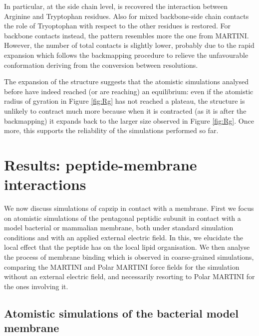 In particular, at the side chain level, is recovered the interaction between Arginine and Tryptophan residues. Also for mixed backbone-side chain contacts the role of Tryoptophan with respect to the other residues is restored. For backbone contacts instead, the pattern resembles more the one from MARTINI. However, the number of total contacts is slightly lower, probably due to the rapid expansion which follows the backmapping procedure to relieve the unfavourable conformation deriving from the conversion between resolutions.

The expansion of the structure suggests that the atomistic simulations analysed before have indeed reached (or are reaching) an equilibrium: even if the atomistic radius of gyration in Figure \ref{fig:Rg} has not reached a plateau, the structure is unlikely to contract much more because when it is contracted (as it is after the backmapping) it expands back to the larger size observed in Figure \ref{fig:Rg}.
Once more, this supports the reliability of the simulations performed so far.



\section{Results: peptide-membrane interactions}

We now discuss simulations of capzip in contact with a membrane. First we focus on atomistic simulations of the pentagonal peptidic subunit in contact with a model bacterial or mammalian membrane, both under standard simulation conditions and with an applied external electric field. In this, we elucidate the local effect that the peptide has on the local lipid organisation.
%
We then analyse the process of membrane binding which is observed in coarse-grained simulations, comparing the MARTINI and Polar MARTINI force fields for the simulation without an external electric field, and necessarily resorting to Polar MARTINI for the ones involving it. 


\subsection{Atomistic simulations of the bacterial model membrane} \label{sec:lip_atom_bact}

